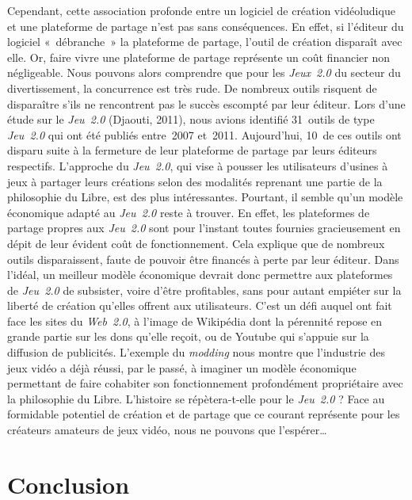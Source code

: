 \documentclass{FramateX}
\begin{document}
\begin{refsection}
Cependant, cette association profonde entre un logiciel de création
vidéoludique et une plateforme de partage n'est pas sans conséquences.
En effet, si l'éditeur du logiciel «~débranche~» la plateforme de
partage, l'outil de création disparaît avec elle. Or, faire vivre une
plateforme de partage représente un coût financier non négligeable.
Nous pouvons alors comprendre que pour les
\textit{Jeux~2.0} du secteur du
divertissement, la concurrence est très rude. De nombreux outils
risquent de disparaître s'ils ne rencontrent pas le succès escompté par
leur éditeur. Lors d'une étude sur le
\textit{Jeu~2.0} (Djaouti, 2011), nous avions
identifié 31~outils de type \textit{Jeu~2.0}
qui ont été publiés entre~2007 et~2011. Aujourd'hui, 10~de ces outils
ont disparu suite à la fermeture de leur plateforme de partage par
leurs éditeurs respectifs. L'approche du
\textit{Jeu~2.0}, qui vise à pousser les
utilisateurs d'usines à jeux à partager leurs créations selon des
modalités reprenant une partie de la philosophie du Libre, est des plus
intéressantes. Pourtant, il semble qu'un modèle économique adapté au
\textit{Jeu~2.0} reste à trouver. En effet,
les plateformes de partage propres aux
\textit{Jeu~2.0} sont pour l'instant toutes
fournies gracieusement en dépit de leur évident coût de fonctionnement.
Cela explique que de nombreux outils disparaissent, faute de pouvoir
être financés à perte par leur éditeur. Dans l'idéal, un meilleur
modèle économique devrait donc permettre aux plateformes de
\textit{Jeu~2.0} de subsister, voire d'être
profitables, sans pour autant empiéter sur la liberté de création
qu'elles offrent aux utilisateurs. C'est un défi auquel ont fait face
les sites du \textit{Web~2.0}, à l'image de
Wikipédia dont la pérennité repose
en grande partie sur les dons qu'elle reçoit, ou de
Youtube qui s'appuie sur la
diffusion de publicités. L'exemple du
\textit{modding} nous montre que l'industrie
des jeux vidéo a déjà réussi, par le passé, à imaginer un modèle
économique permettant de faire cohabiter son fonctionnement
profondément propriétaire avec la philosophie du Libre. L'histoire se
répètera-t-elle pour le \textit{Jeu~2.0} ?
Face au formidable potentiel de création et de partage que ce courant
représente pour les créateurs amateurs de jeux vidéo, nous ne pouvons
que l'espérer…



\section*{Conclusion}
{}


\end{refsection}
\end{document}
